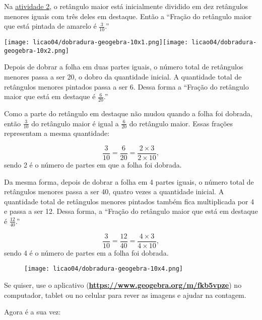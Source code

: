 \begin{refletindo*}{}
  Na \hyperref[chap4-ativ2]{atividade 2}, o retângulo maior está inicialmente dividido em dez retângulos menores iguais com três deles em destaque. Então a ``Fração do retângulo maior que está pintada de amarelo é $\frac{3}{10}$.''

\begin{center}
  \texttt{[image: licao04/dobradura-geogebra-10x1.png]}\quad \texttt{[image: licao04/dobradura-geogebra-10x2.png]}
\end{center}

  Depois de dobrar a folha em duas partes iguais, o número total de retângulos menores passa a ser 20, o dobro da quantidade inicial. A  quantidade total de retângulos menores pintados passa a ser 6. Dessa forma a ``Fração do retângulo maior que está em destaque é $\frac{6}{20}$.''

Como a parte do retângulo em destaque não mudou quando a folha foi dobrada,  então $\frac{3}{10}$ do retângulo maior é igual a  $\frac{6}{20}$ do retângulo maior. Essas frações representam a mesma quantidade:

$$\dfrac{3}{10} = \dfrac{6}{20} = \dfrac{2 \times 3}{2 \times 10},$$
sendo 2 é o número de partes em que a folha foi dobrada.

Da mesma forma, depois de dobrar a folha em 4 partes iguais, o número total de retângulos menores passa a ser 40, quatro vezes a quantidade inicial. A quantidade total de retângulos menores pintados também fica multiplicada por 4 e passa a ser 12. Dessa forma, a  ``Fração do retângulo maior que está em destaque é $\frac{12}{40}$.''

$$\dfrac{3}{10} = \dfrac{12}{40} = \dfrac{4 \times 3}{4 \times 10},$$
sendo 4 é o número de partes em a folha foi dobrada.

\begin{figure}[H]
\centering

\texttt{[image: licao04/dobradura-geogebra-10x4.png]}
\end{figure}

Se quiser, use o aplicativo (\textbf{\url{https://www.geogebra.org/m/fkb5vpze}}) no computador, tablet ou no celular para rever as imagens e ajudar na contagem.

Agora é a sua vez:

\begin{center}
\end{center}


\end{refletindo*}
